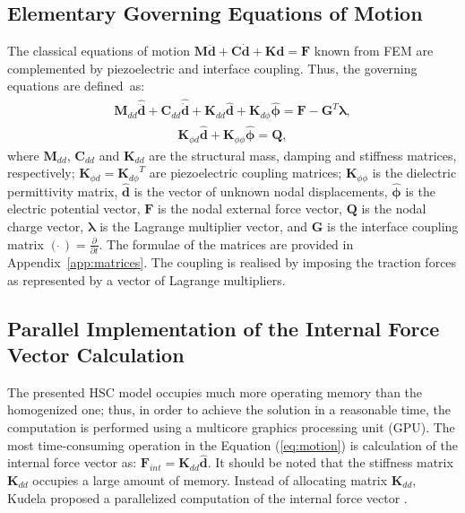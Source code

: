 \documentclass[sensors,article,accept,moreauthors,pdftex]{Definitions/mdpi}
\begin{document}
\begin{paracol}{2}
\subsection{Elementary Governing Equations of Motion}
\label{sec:motion}
The classical equations of motion \(\textbf{M}\ddot{\textbf{d}} + \textbf{C}\dot{\textbf{d}} + \textbf{K}\textbf{d} = \textbf{F}\) known from FEM are complemented by piezoelectric and interface coupling. Thus, the governing equations are defined~as:
\begin{eqnarray}
\textbf{M}_{dd} \widehat{\ddot{\textbf{d}}} + \textbf{C}_{dd} \widehat{\dot{\textbf{d}}} + \textbf{K}_{dd} \widehat{\textbf{d}} + \textbf{K}_{d\phi} \widehat{\boldsymbol{\phi}} = \textbf{F} - \textbf{G}^T \boldsymbol{\lambda},
\label{eq:motion}
\end{eqnarray}
\begin{eqnarray}
\textbf{K}_{\phi d}\widehat{\textbf{d}} + \textbf{K}_{\phi \phi} \widehat{\boldsymbol{\phi}} = \textbf{Q},
\label{eq:piezocoupling}
\end{eqnarray} 
where \(\textbf{M}_{dd}\), \(\textbf{C}_{dd}\) and \(\textbf{K}_{dd}\) are the structural mass, damping and stiffness matrices, respectively; \(\textbf{K}_{\phi d}={\textbf{K}_{d\phi}}^T\) are  piezoelectric coupling matrices; \(\textbf{K}_{\phi \phi}\) is the dielectric permittivity matrix, \(\widehat{\textbf{d}}\) is the vector of unknown nodal displacements,  \(\widehat{\boldsymbol{\phi}}\) is the electric potential vector, \(\textbf{F}\) is the nodal external force vector, \(\textbf{Q}\) is the nodal charge vector, \(\boldsymbol{\lambda}\) is the Lagrange multiplier vector, and \(\textbf{G}\) is the interface coupling matrix \((\dot{\ })=\frac{\partial}{\partial t}\).
The formulae of the matrices are provided in Appendix~\ref{app:matrices}.
The coupling is realised by imposing the traction forces as represented by a vector of Lagrange multipliers.
\subsection{Parallel Implementation of the Internal Force Vector Calculation}
\label{sec:f_internal}
The presented HSC model occupies much more operating memory than the homogenized one; thus, in order to achieve the solution in a reasonable time, the computation is performed using a multicore graphics processing unit (GPU).  
The most time-consuming operation in the Equation (\ref{eq:motion}) is calculation of the internal force vector as: \(\textbf{F}_{int}=\textbf{K}_{dd} \widehat{\textbf{d}}\).
It should be noted that the stiffness matrix \(\textbf{K}_{dd}\) occupies a large amount of memory.
Instead of allocating matrix \(\textbf{K}_{dd}\), Kudela proposed a parallelized computation of the internal force vector \cite{kudela2016parallel}.



\end{paracol}
\end{document}
